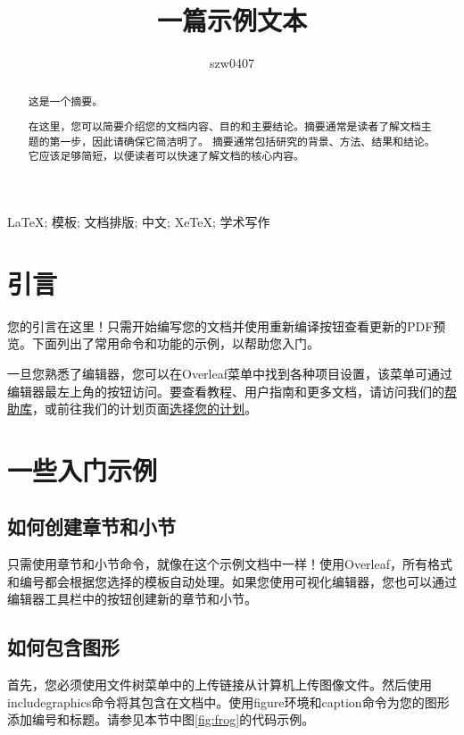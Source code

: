 \documentclass{article}
\title{一篇示例文本}
\author{szw0407}
\begin{document}
\maketitle

\begin{abstract}
      这是一个摘要。

      在这里，您可以简要介绍您的文档内容、目的和主要结论。摘要通常是读者了解文档主题的第一步，因此请确保它简洁明了。
      摘要通常包括研究的背景、方法、结果和结论。它应该足够简短，以便读者可以快速了解文档的核心内容。
\end{abstract}

\begin{keywords}
      LaTeX; 模板; 文档排版; 中文; XeTeX; 学术写作
\end{keywords}
\newpage

\tableofcontents
\newpage
\section{引言}

您的引言在这里！只需开始编写您的文档并使用重新编译按钮查看更新的PDF预览。下面列出了常用命令和功能的示例，以帮助您入门。

一旦您熟悉了编辑器，您可以在Overleaf菜单中找到各种项目设置，该菜单可通过编辑器最左上角的按钮访问。要查看教程、用户指南和更多文档，请访问我们的\href{https://www.overleaf.com/learn}{帮助库}，或前往我们的计划页面\href{https://www.overleaf.com/user/subscription/plans}{选择您的计划}。

\section{一些入门示例}

\subsection{如何创建章节和小节}

只需使用章节和小节命令，就像在这个示例文档中一样！使用Overleaf，所有格式和编号都会根据您选择的模板自动处理。如果您使用可视化编辑器，您也可以通过编辑器工具栏中的按钮创建新的章节和小节。

\subsection{如何包含图形}

首先，您必须使用文件树菜单中的上传链接从计算机上传图像文件。然后使用includegraphics命令将其包含在文档中。使用figure环境和caption命令为您的图形添加编号和标题。请参见本节中图\ref{fig:frog}的代码示例。
\end{document}
